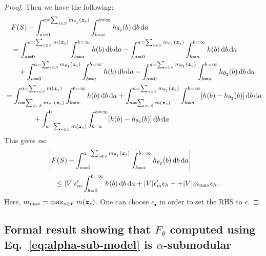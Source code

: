\documentclass{article}
\def\d{\mathrm{d}}
\begin{document}
\begin{proof}
Then we have the following:
\begin{align}
  & F(S) -   \int_{a=0} ^{a=\sum_{s\in S}m_{\theta_1}(\zb_s)} \int_{b=a} ^{b=\infty}  h_{\theta_2}(b)\, \d b \, \d a \\
  &=  \int_{a=0} ^{a=\sum_{s\in S}m(\zb_s)} \int_{b=a} ^{b=\infty}  h(b)\, \d b \, \d a -   \int_{a=0} ^{a=\sum_{s\in S}m_{\theta_1}(\zb_s)} \int_{b=a} ^{b=\infty}  h (b)\, \d b \, \d a \\
  &\quad +   \int_{a=0} ^{a=\sum_{s\in S}m_{\theta_1}(\zb_s)} \int_{b=a} ^{b=\infty}  h (b)\, \d b \, \d a- \int_{a=0} ^{a=\sum_{s\in S}m_{\theta_1}(\zb_s)} \int_{b=a} ^{b=\infty}  h_{\theta_2}(b)\, \d b \, \d a
  \end{align}
  \begin{align}
  & = \int_{a=\sum_{s\in S} m_{\theta_1}(\zb_s)} ^{a=\sum_{s\in S} m(\zb_s)} \int_{b=a} ^{b=\infty}  h(b)\, \d b \, \d a + \int_{a=\sum_{s\in S} m (\zb_s)} ^{a=\sum_{s\in S} m_{\theta_1}(\zb_s)} \int_{b=a} ^{b=\infty}  [h(b) -h_{\theta_2}(b)]\, \d b \, \d a\\
  & \qquad \qquad + \int_{a=\sum_{s\in S} m(\zb_s)} ^{0} \int_{b=a} ^{b=\infty}  [h(b) -h_{\theta_2}(b)]\, \d b \, \d a
\end{align}
This gives us:
\begin{align}
    &\left|F(S) -   \int_{a=0} ^{a=\sum_{s\in S}m_{\theta_1}(\zb_s)} \int_{b=a} ^{b=\infty}  h_{\theta_2}(b)\, \d b \, \d a\right|\\
    &\quad \le |V|\epsilon' _m \int_{b=0} ^{b=\infty}  h(b)\, \d b \, \d a +|V|\epsilon' _m \epsilon_h + +|V|m_{\max} \epsilon_h. 
\end{align}
Here, $m_{\max} = \max_{s\in V} m(\bm{z}_s)$. One can choose $\epsilon_{\bullet}$ in order to set the RHS to $\epsilon$.
 \end{proof} 

\subsection{Formal result showing that $F_{\theta}$ computed using Eq.~\eqref{eq:alpha-sub-model}  is $\alpha$-submodular}
\end{document}
